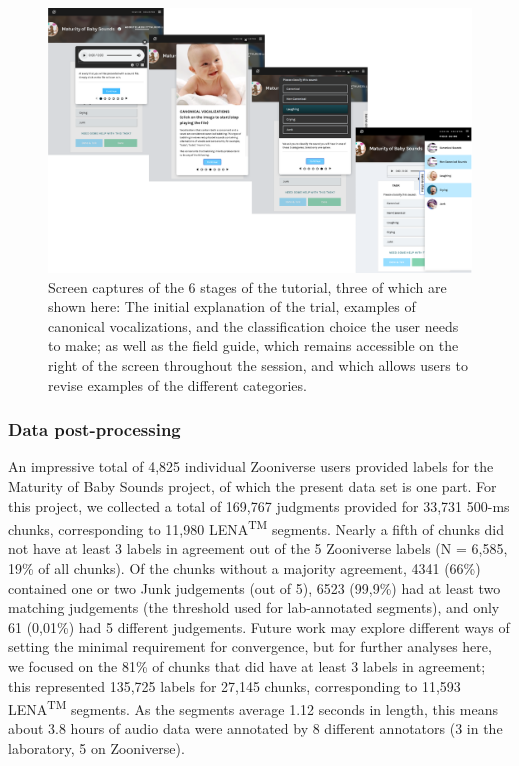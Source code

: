 \documentclass[english,,man,floatsintext]{apa6}
\begin{document}
\begin{figure}
\centering
\includegraphics{zooniverse-pufig.pdf}
\caption{\label{fig:fig-zoo}Screen captures of the 6 stages of the tutorial, three of which are shown here: The initial explanation of the trial, examples of canonical vocalizations, and the classification choice the user needs to make; as well as the field guide, which remains accessible on the right of the screen throughout the session, and which allows users to revise examples of the different categories.}
\end{figure}

\hypertarget{data-post-processing}{%
\subsubsection{Data post-processing}\label{data-post-processing}}

An impressive total of 4,825 individual Zooniverse users provided labels for the Maturity of Baby Sounds project, of which the present data set is one part. For this project, we collected a total of 169,767 judgments provided for 33,731 500-ms chunks, corresponding to 11,980 LENA\textsuperscript{TM} segments. Nearly a fifth of chunks did not have at least 3 labels in agreement out of the 5 Zooniverse labels (N = 6,585, 19\% of all chunks). Of the chunks without a majority agreement, 4341 (66\%) contained one or two Junk judgements (out of 5), 6523 (99,9\%) had at least two matching judgements (the threshold used for lab-annotated segments), and only 61 (0,01\%) had 5 different judgements. Future work may explore different ways of setting the minimal requirement for convergence, but for further analyses here, we focused on the 81\% of chunks that did have at least 3 labels in agreement; this represented 135,725 labels for 27,145 chunks, corresponding to 11,593 LENA\textsuperscript{TM} segments. As the segments average 1.12 seconds in length, this means about 3.8 hours of audio data were annotated by 8 different annotators (3 in the laboratory, 5 on Zooniverse).
\end{document}

